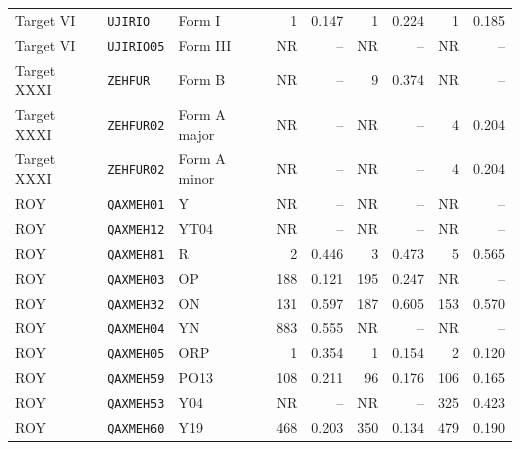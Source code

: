 \begin{table}[H]
\begin{tabular}{@{}lllrrrrrr@{}}
Target VI & \texttt{UJIRIO} & Form I
& 1 & 0.147 & 1 & 0.224 & 1 & 0.185 \\
Target VI & \texttt{UJIRIO05} & Form III
& NR & -- & NR & -- & NR & -- \\
\addlinespace[3pt]

Target XXXI & \texttt{ZEHFUR} & Form B
& NR & -- & 9 & 0.374 & NR & -- \\
Target XXXI & \texttt{ZEHFUR02} & Form A major
& NR & -- & NR & -- & 4 & 0.204 \\
Target XXXI & \texttt{ZEHFUR02} & Form A minor
& NR & -- & NR & -- & 4 & 0.204 \\
\addlinespace[3pt]

ROY & \texttt{QAXMEH01} & Y
& NR & -- & NR & -- & NR & -- \\
ROY & \texttt{QAXMEH12} & YT04
& NR & -- & NR & -- & NR & -- \\
ROY & \texttt{QAXMEH81} & R
& 2 & 0.446 & 3 & 0.473 & 5 & 0.565 \\
ROY & \texttt{QAXMEH03} & OP
& 188 & 0.121 & 195 & 0.247 & NR & -- \\
ROY & \texttt{QAXMEH32} & ON
& 131 & 0.597 & 187 & 0.605 & 153 & 0.570 \\
ROY & \texttt{QAXMEH04} & YN
& 883 & 0.555 & NR & -- & NR & -- \\
ROY & \texttt{QAXMEH05} & ORP
& 1 & 0.354 & 1 & 0.154 & 2 & 0.120 \\
ROY & \texttt{QAXMEH59} & PO13
& 108 & 0.211 & 96 & 0.176 & 106 & 0.165 \\
ROY & \texttt{QAXMEH53} & Y04
& NR & -- & NR & -- & 325 & 0.423 \\
ROY & \texttt{QAXMEH60} & Y19
& 468 & 0.203 & 350 & 0.134 & 479 & 0.190 \\
\bottomrule
\end{tabular}%
\end{table}